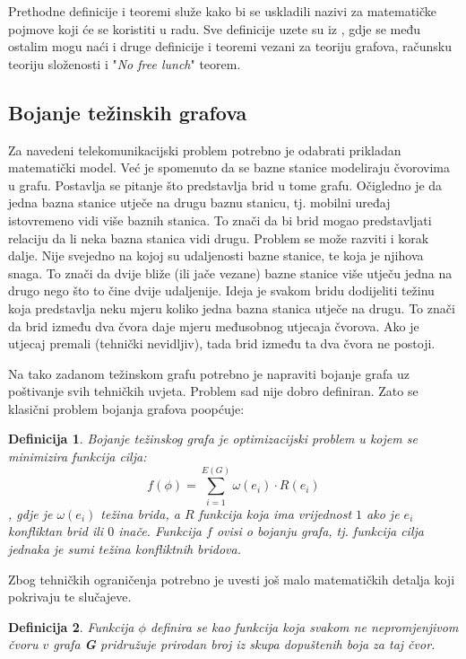 \documentclass[times, utf8, diplomski, numeric]{fer}
\newtheorem{definition}{Definicija}
\begin{document}
Prethodne definicije i teoremi služe kako bi se uskladili nazivi za matematičke pojmove koji će se koristiti u radu. Sve definicije uzete su iz \cite{lit16, lit15, lit19}, gdje se među ostalim mogu naći i druge definicije i teoremi vezani za teoriju grafova, računsku teoriju složenosti i "\emph{No free lunch}" teorem.

\subsection{Bojanje težinskih grafova}

Za navedeni telekomunikacijski problem potrebno je odabrati prikladan matematički model. Već je spomenuto da se bazne stanice modeliraju čvorovima u grafu. Postavlja se pitanje što predstavlja brid u tome grafu. Očigledno je da jedna bazna stanice utječe na drugu baznu stanicu, tj. mobilni uređaj istovremeno vidi više baznih stanica. To znači da bi brid mogao predstavljati relaciju da li neka bazna stanica vidi drugu. Problem se može razviti i korak dalje. Nije svejedno na kojoj su udaljenosti bazne stanice, te koja je njihova snaga. To znači da dvije bliže (ili jače vezane) bazne stanice više utječu jedna na drugo nego što to čine dvije udaljenije. Ideja je svakom bridu dodijeliti težinu koja predstavlja neku mjeru koliko jedna bazna stanica utječe na drugu. To znači da brid između dva čvora daje mjeru međusobnog utjecaja čvorova. Ako je utjecaj premali (tehnički nevidljiv), tada brid između ta dva čvora ne postoji.

Na tako zadanom težinskom grafu potrebno je napraviti bojanje grafa uz poštivanje svih tehničkih uvjeta. Problem sad nije dobro definiran. Zato se klasični problem bojanja grafova poopćuje:

\begin{definition}
Bojanje težinskog grafa je optimizacijski problem u kojem se minimizira funkcija cilja:
\begin{equation}
f(\phi) = \sum_{i=1}^{E(G)} \omega(e_i) \cdot R(e_i)
\end{equation}
, gdje je $\omega(e_i)$ težina brida, a $R$ funkcija koja ima vrijednost $1$ ako je $e_i$ konfliktan brid ili $0$ inače. Funkcija $f$ ovisi o bojanju grafa, tj. funkcija cilja jednaka je sumi težina konfliktnih bridova.
\end{definition}

Zbog tehničkih ograničenja potrebno je uvesti još malo matematičkih detalja koji pokrivaju te slučajeve.

\begin{definition}
Funkcija $\phi$ definira se kao funkcija koja svakom ne nepromjenjivom čvoru $v$ grafa \textbf{G} pridružuje prirodan broj iz skupa dopuštenih boja za taj čvor.
\end{definition}
\end{document}
